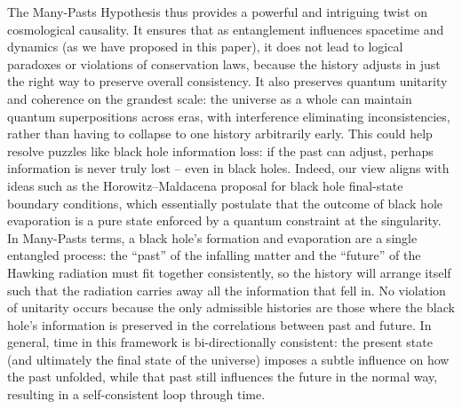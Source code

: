 \documentclass[11pt]{article}
\begin{document}
The Many-Pasts Hypothesis thus provides a powerful and intriguing twist on cosmological causality. It ensures that as entanglement influences spacetime and dynamics (as we have proposed in this paper), it does not lead to logical paradoxes or violations of conservation laws, because the history adjusts in just the right way to preserve overall consistency. It also preserves quantum unitarity and coherence on the grandest scale: the universe as a whole can maintain quantum superpositions across eras, with interference eliminating inconsistencies, rather than having to collapse to one history arbitrarily early. This could help resolve puzzles like black hole information loss: if the past can adjust, perhaps information is never truly lost – even in black holes. Indeed, our view aligns with ideas such as the Horowitz–Maldacena proposal for black hole final-state boundary conditions, which essentially postulate that the outcome of black hole evaporation is a pure state enforced by a quantum constraint at the singularity​. In Many-Pasts terms, a black hole’s formation and evaporation are a single entangled process: the “past” of the infalling matter and the “future” of the Hawking radiation must fit together consistently, so the history will arrange itself such that the radiation carries away all the information that fell in​. No violation of unitarity occurs because the only admissible histories are those where the black hole’s information is preserved in the correlations between past and future. In general, time in this framework is bi-directionally consistent: the present state (and ultimately the final state of the universe) imposes a subtle influence on how the past unfolded, while that past still influences the future in the normal way, resulting in a self-consistent loop through time.
\end{document}
